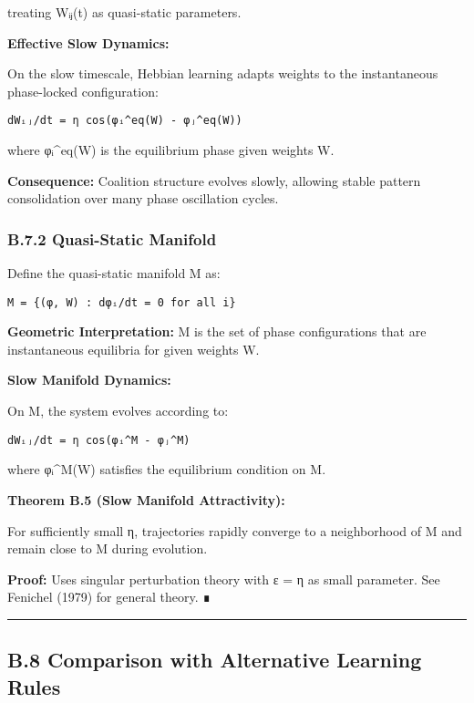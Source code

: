 \documentclass[
]{article}
\begin{document}
treating Wᵢⱼ(t) as quasi-static parameters.

\textbf{Effective Slow Dynamics:}

On the slow timescale, Hebbian learning adapts weights to the
instantaneous phase-locked configuration:

\begin{verbatim}
dWᵢⱼ/dt = η cos(φᵢ^eq(W) - φⱼ^eq(W))
\end{verbatim}

where φᵢ\^{}eq(W) is the equilibrium phase given weights W.

\textbf{Consequence:} Coalition structure evolves slowly, allowing
stable pattern consolidation over many phase oscillation cycles.

\subsubsection{B.7.2 Quasi-Static
Manifold}\label{b.7.2-quasi-static-manifold}

Define the quasi-static manifold M as:

\begin{verbatim}
M = {(φ, W) : dφᵢ/dt = 0 for all i}
\end{verbatim}

\textbf{Geometric Interpretation:} M is the set of phase configurations
that are instantaneous equilibria for given weights W.

\textbf{Slow Manifold Dynamics:}

On M, the system evolves according to:

\begin{verbatim}
dWᵢⱼ/dt = η cos(φᵢ^M - φⱼ^M)
\end{verbatim}

where φᵢ\^{}M(W) satisfies the equilibrium condition on M.

\textbf{Theorem B.5 (Slow Manifold Attractivity):}

For sufficiently small η, trajectories rapidly converge to a
neighborhood of M and remain close to M during evolution.

\textbf{Proof:} Uses singular perturbation theory with ε = η as small
parameter. See Fenichel (1979) for general theory. ∎

\begin{center}\rule{0.5\linewidth}{0.5pt}\end{center}

\subsection{B.8 Comparison with Alternative Learning
Rules}\label{b.8-comparison-with-alternative-learning-rules}
\end{document}
